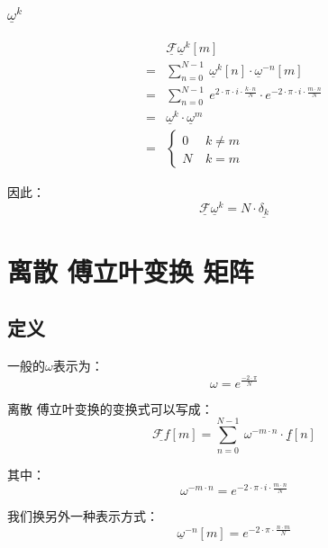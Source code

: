 \subsubsection{$\underline{\omega}^k$}
\begin{align*}
	  & \underline{\mathcal{F}}\underline{\omega}^k[m]                                                                             \\
	= & \sum\limits_{n=0}^{N-1}\ \underline{\omega}^k[n]\cdot \underline{\omega}^{-n}[m]                                           \\
	= & \sum\limits_{n=0}^{N-1}\ e^{2\cdot \pi\cdot i\cdot \frac{k\cdot n}{N}}\cdot e^{-2\cdot \pi\cdot i\cdot \frac{m\cdot n}{N}} \\
	= & \underline{\omega}^k\cdot \underline{\omega}^m                                                                             \\
	= & \begin{cases}
		0 & \ k\neq m \\
		N & \ k=m
	\end{cases}
\end{align*}

因此：
\begin{equation}
	\underline{\mathcal{F}}\underline{\omega}^k=N\cdot \underline{\delta_k}
\end{equation}

\section{离散 傅立叶变换 矩阵}
\subsection{定义}
一般的$\omega$表示为：
$$
	\omega=e^{\frac{-2\cdot\pi}{N}}
$$

离散 傅立叶变换的变换式可以写成：
$$
	\underline{\mathcal{F}f}[m]=\sum\limits_{n=0}^{N-1}\ \omega^{-m\cdot n}\cdot \underline{f}[n]
$$

其中：
$$
	\omega^{-m\cdot n}=e^{-2\cdot \pi\cdot i\cdot \frac{m\cdot n}{N}}
$$

我们换另外一种表示方式：
$$
	\underline{\omega}^{-n}[m]=e^{-2\cdot\pi\cdot\frac{ n\cdot m}{N}}
$$


